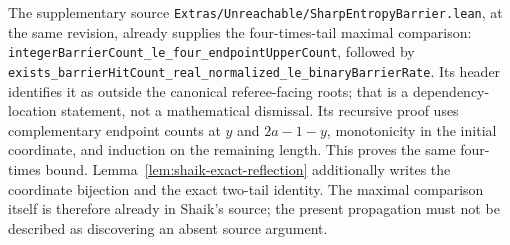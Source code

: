 \documentclass[11pt]{article}
\theoremstyle{remark}\newtheorem{remark}[proposition]{Remark}
\begin{document}
The supplementary source
\texttt{Extras/Unreachable/SharpEntropyBarrier.lean}, at the same
revision, already supplies the four-times-tail maximal comparison:
\texttt{integerBarrierCount\_le\_four\_endpointUpperCount}, followed by
\texttt{exists\_barrierHitCount\_real\_normalized\_le\_binaryBarrierRate}.
Its header identifies it as outside the canonical referee-facing roots;
that is a dependency-location statement, not a mathematical dismissal.
Its recursive proof uses complementary endpoint counts at \(y\) and
\(2a-1-y\), monotonicity in the initial coordinate, and induction on
the remaining length. This proves the same four-times bound.
Lemma~\ref{lem:shaik-exact-reflection} additionally writes the
coordinate bijection and the exact two-tail identity. The maximal
comparison itself is therefore already in Shaik's source;
the present propagation must not be described as discovering an
absent source argument.
\end{document}
